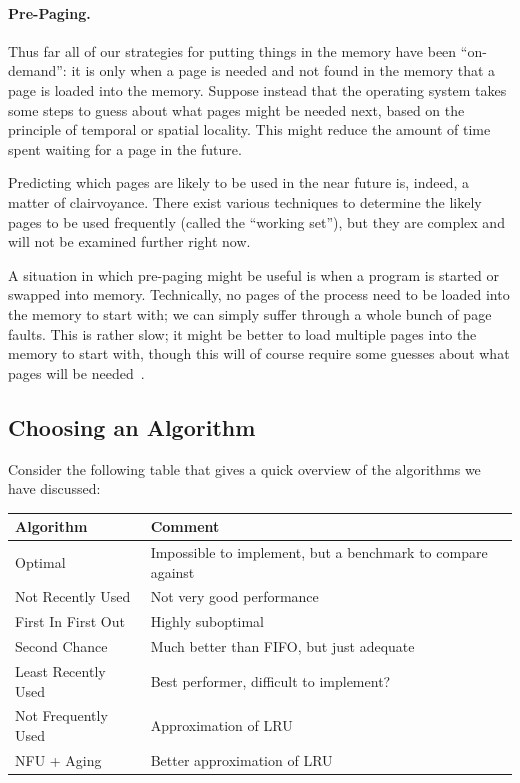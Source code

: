 \paragraph{Pre-Paging.}
Thus far all of our strategies for putting things in the memory have been ``on-demand'': it is only when a page is needed and not found in the memory that a page is loaded into the memory. Suppose instead that the operating system takes some steps to guess about what pages might be needed next, based on the principle of temporal or spatial locality. This might reduce the amount of time spent waiting for a page in the future.

Predicting which pages are likely to be used in the near future is, indeed, a matter of clairvoyance. There exist various techniques to determine the likely pages to be used frequently (called the ``working set''), but they are complex and will not be examined further right now.

A situation in which pre-paging might be useful is when a program is started or swapped into memory. Technically, no pages of the process need to be loaded into the memory to start with; we can simply suffer through a whole bunch of page faults. This is rather slow; it might be better to load multiple pages into the memory to start with, though this will of course require some guesses about what pages will be needed~\cite{mos}.

\subsection*{Choosing an Algorithm}
Consider the following table that gives a quick overview of the algorithms we have discussed:

\begin{center}
\begin{tabular}{l|l}
	\textbf{Algorithm} & \textbf{Comment} \\ \hline
	Optimal & Impossible to implement, but a benchmark to compare against\\
	Not Recently Used &  Not very good performance \\
	First In First Out & Highly suboptimal \\
	Second Chance & Much better than FIFO, but just adequate \\
	Least Recently Used & Best performer, difficult to implement? \\
	Not Frequently Used & Approximation of LRU \\
	NFU + Aging & Better approximation of LRU\\
\end{tabular}
\end{center}


